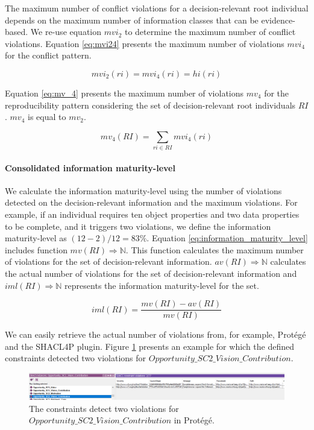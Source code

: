 The maximum number of conflict violations for a decision-relevant root individual depends on the maximum number of information classes that can be evidence-based. We re-use equation $mvi_2$ to determine the maximum number of conflict violations. Equation \ref{eq:mvi24} presents the maximum number of violations $mvi_4$ for the conflict pattern. 

\begin{equation} \label{eq:mvi24}
mvi_2(ri) = mvi_4(ri) = hi(ri)
\end{equation}

Equation \ref{eq:mv_4} presents the maximum number of violations $mv_4$ for the reproducibility pattern considering the set of decision-relevant root individuals $RI$. $mv_4$ is equal to $mv_2$.

\begin{equation} \label{eq:mv_4}
mv_4(RI) = \sum_{ri \in RI} mvi_4(ri)
\end{equation}

\paragraph{Consolidated information maturity-level}
We calculate the information maturity-level using the number of violations detected on the decision-relevant information and the maximum violations. For example, if an individual requires ten object properties and two data properties to be complete, and it triggers two violations, we define the information maturity-level as $(12-2)/12 = 83\%$. Equation \ref{eq:information_maturity_level} includes function $mv(RI) \Rightarrow \mathbb{N}$. This function calculates the maximum number of violations for the set of decision-relevant information. $av(RI) \Rightarrow \mathbb{N}$ calculates the actual number of violations for the set of decision-relevant information and $iml(RI) \Rightarrow \mathbb{N}$ represents the information maturity-level for the set.

\begin{equation} \label{eq:information_maturity_level}
iml(RI) = \dfrac{mv(RI)-av(RI)}{mv(RI)}
\end{equation}

We can easily retrieve the actual number of violations from, for example, Prot\'eg\'e and the SHACL4P plugin. Figure \ref{fig:04_Presentation_IML_SHACL4P} presents an example for which the defined constraints detected two violations for $Opportunity\_SC2\_Vision\_Contribution$. 

\begin{figure}[H]
\centering
  \includegraphics[width=17cm]{../../Images/04_Contribution/04_Presentation_IML_SHACL4P.png}
  \caption{The constraints detect two violations for $Opportunity\_SC2\_Vision\_Contribution$ in Prot\'eg\'e.}
  \label{fig:04_Presentation_IML_SHACL4P}
\end{figure}

